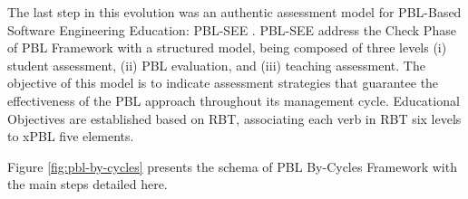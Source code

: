 The last step in this evolution was an authentic assessment model for
\gls{PBL}-Based Software Engineering Education: \gls{PBL-SEE} \cite{santos:2016}. \gls{PBL-SEE} address the Check Phase of \gls{PBL} Framework with a structured model, being composed of three levels (i) student assessment, (ii) \gls{PBL} evaluation, and (iii) teaching assessment. The objective of this model is to indicate assessment strategies that guarantee the effectiveness of the \gls{PBL} approach throughout its management cycle. Educational Objectives are established based on \gls{RBT}, associating each verb in \gls{RBT} six levels to \gls{xPBL} five elements. 

Figure \ref{fig:pbl-by-cycles} presents the schema of \gls{PBL} By-Cycles Framework with the main steps detailed here.